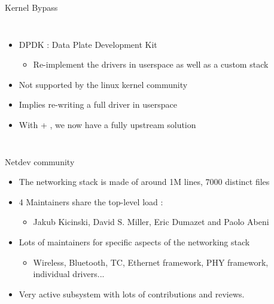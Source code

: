 \begin{frame}{Kernel Bypass}
\begin{columns}
\begin{itemize}
		\item DPDK : Data Plate Development Kit
			\begin{itemize}
				\item Re-implement the drivers in userspace as well as a custom stack
			\end{itemize}
		\item Not supported by the linux kernel community
		\item Implies re-writing a full driver in userspace
		\item With  + , we now have a fully upstream solution
	\end{itemize}
	\end{columns}
\end{frame}

\begin{frame}{Netdev community}
	\begin{itemize}
		\item The networking stack is made of around 1M lines, 7000 distinct files
		\item 4 Maintainers share the top-level load :
			\begin{itemize}
				\item Jakub Kicinski, David S. Miller, Eric Dumazet and Paolo Abeni
			\end{itemize}
		\item Lots of maintainers for specific aspects of the networking stack
			\begin{itemize}
				\item Wireless, Bluetooth, TC, Ethernet framework, PHY framework, individual drivers...
			\end{itemize}
		\item Very active subsystem with lots of contributions and reviews.
	\end{itemize}
\end{frame}

